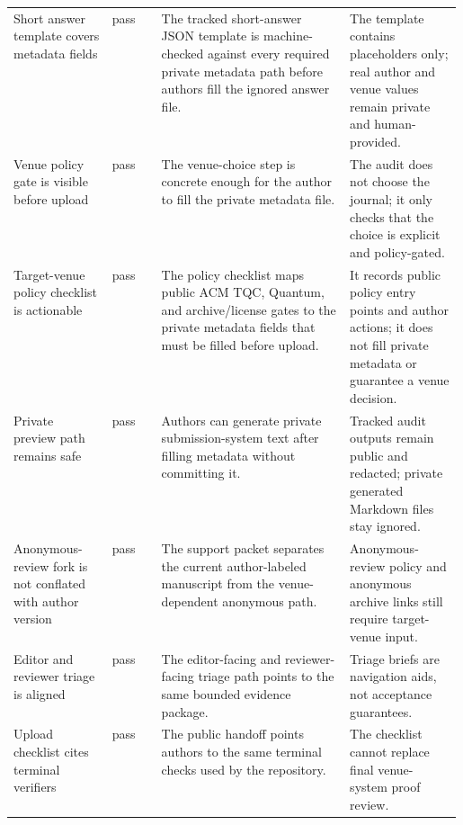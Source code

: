 \begin{tabularx}{\linewidth}{>{\raggedright\arraybackslash}p{0.22\linewidth}>{\raggedright\arraybackslash}p{0.11\linewidth}>{\raggedright\arraybackslash}X>{\raggedright\arraybackslash}p{0.25\linewidth}}
Short answer template covers metadata fields & pass & The tracked short-answer JSON template is machine-checked against every required private metadata path before authors fill the ignored answer file. & The template contains placeholders only; real author and venue values remain private and human-provided. \\
Venue policy gate is visible before upload & pass & The venue-choice step is concrete enough for the author to fill the private metadata file. & The audit does not choose the journal; it only checks that the choice is explicit and policy-gated. \\
Target-venue policy checklist is actionable & pass & The policy checklist maps public ACM TQC, Quantum, and archive/license gates to the private metadata fields that must be filled before upload. & It records public policy entry points and author actions; it does not fill private metadata or guarantee a venue decision. \\
Private preview path remains safe & pass & Authors can generate private submission-system text after filling metadata without committing it. & Tracked audit outputs remain public and redacted; private generated Markdown files stay ignored. \\
Anonymous-review fork is not conflated with author version & pass & The support packet separates the current author-labeled manuscript from the venue-dependent anonymous path. & Anonymous-review policy and anonymous archive links still require target-venue input. \\
Editor and reviewer triage is aligned & pass & The editor-facing and reviewer-facing triage path points to the same bounded evidence package. & Triage briefs are navigation aids, not acceptance guarantees. \\
Upload checklist cites terminal verifiers & pass & The public handoff points authors to the same terminal checks used by the repository. & The checklist cannot replace final venue-system proof review. \\
\bottomrule
\end{tabularx}
